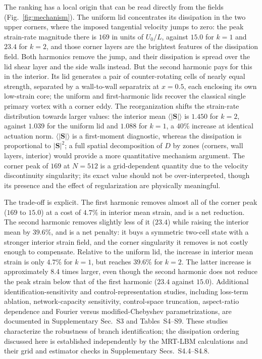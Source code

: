 \documentclass[11pt,a4paper]{article}
\newcommand{\Sij}{\mathbf{S}}
\newenvironment{chgadd}{\par\color{blue}}{\par\color{black}}
\begin{document}
\begin{chgadd}
The ranking has a local origin that can be read directly from the fields
(Fig.~\ref{fig:mechanism}). The uniform lid concentrates its dissipation in the
two upper corners, where the imposed tangential velocity jumps to zero: the peak
strain-rate magnitude there is $169$ in units of $U_0/L$, against $15.0$ for
$k=1$ and $23.4$ for $k=2$, and those corner layers are the brightest features of
the dissipation field. Both harmonics remove the jump, and their dissipation is
spread over the lid shear layer and the side walls instead. But the second
harmonic pays for this in the interior. Its lid generates a pair of
counter-rotating cells of nearly equal strength, separated by a wall-to-wall
separatrix at $x=0.5$, each enclosing its own low-strain core; the uniform and
first-harmonic lids recover the classical single primary vortex with a corner
eddy. The reorganization shifts the strain-rate distribution towards larger
values: the interior mean $\langle|\Sij|\rangle$ is $1.450$ for $k=2$, against
$1.039$ for the uniform lid and $1.088$ for $k=1$, a $40\%$ increase at identical
actuation norm. $\langle|\Sij|\rangle$ is a first-moment diagnostic,
whereas the dissipation is proportional to $|\Sij|^2$; a full spatial decomposition
of $D$ by zones (corners, wall layers, interior) would provide a more quantitative
mechanism argument. The corner peak of $169$ at $N=512$ is a grid-dependent
quantity due to the velocity discontinuity singularity; its exact value should not
be over-interpreted, though its presence and the effect of regularization are
physically meaningful.

The trade-off is explicit. The first harmonic removes almost all of the corner
peak ($169$ to $15.0$) at a cost of $4.7\%$ in interior mean strain, and is a net
reduction. The second harmonic removes slightly less of it ($23.4$) while raising
the interior mean by $39.6\%$, and is a net penalty: it buys a symmetric two-cell
state with a stronger interior strain field, and the corner singularity it removes
is not costly enough to compensate. Relative to the uniform lid, the increase in
interior mean strain is only $4.7\%$ for $k=1$, but reaches $39.6\%$ for $k=2$.
The latter increase is approximately 8.4 times larger, even though the second
harmonic does not reduce the peak strain below that of the first harmonic ($23.4$
against $15.0$). Additional identification-sensitivity and control-representation
studies, including loss-term ablation, network-capacity sensitivity,
control-space truncation, aspect-ratio dependence and Fourier versus
modified-Chebyshev parametrizations, are documented in
Supplementary Sec.~S3 and Tables~S4--S9.
These studies characterize the robustness of branch identification;
the dissipation ordering discussed here is established independently
by the MRT-LBM calculations and their grid and estimator checks
in Supplementary Secs.~S4.4--S4.8.
\end{chgadd}
\end{document}
